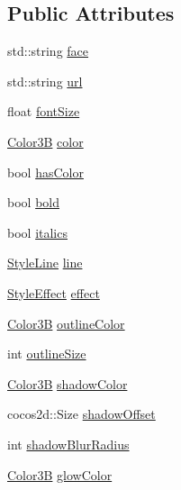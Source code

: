 \subsection*{Public Attributes}
\begin{DoxyCompactItemize}
\item 
std\+::string \hyperlink{structMyXMLVisitor_1_1Attributes_a8beb5513ad9e1cb927264f9ce4b37853}{face}
\item 
std\+::string \hyperlink{structMyXMLVisitor_1_1Attributes_ad50d857585d8559a33750a20c69c2843}{url}
\item 
float \hyperlink{structMyXMLVisitor_1_1Attributes_a9b879f7f8b98152e72396e881d9b310a}{font\+Size}
\item 
\hyperlink{structColor3B}{Color3B} \hyperlink{structMyXMLVisitor_1_1Attributes_a8fdc77de0eb7e0934c03437739392bb9}{color}
\item 
bool \hyperlink{structMyXMLVisitor_1_1Attributes_a3f0be96697ab0ffef086be9dfac55874}{has\+Color}
\item 
bool \hyperlink{structMyXMLVisitor_1_1Attributes_a2e76dd338cab73ef811b2954aad1dc62}{bold}
\item 
bool \hyperlink{structMyXMLVisitor_1_1Attributes_a3e6f2bee10a43fe6f2a022f118f66408}{italics}
\item 
\hyperlink{classMyXMLVisitor_a75a0b4e2723f798f35a0941ddba7c5a7}{Style\+Line} \hyperlink{structMyXMLVisitor_1_1Attributes_a14f09e95fdb1e89a922551830b5a6a30}{line}
\item 
\hyperlink{classMyXMLVisitor_a7f84d816c0b481e9cb35884996af6c2c}{Style\+Effect} \hyperlink{structMyXMLVisitor_1_1Attributes_a3c43060c939b2bc3301d2f987786eb9d}{effect}
\item 
\hyperlink{structColor3B}{Color3B} \hyperlink{structMyXMLVisitor_1_1Attributes_aca849a5371226911b3be1aadcfa3d1d6}{outline\+Color}
\item 
int \hyperlink{structMyXMLVisitor_1_1Attributes_a1ee02825e29b787efd1b8191434349b7}{outline\+Size}
\item 
\hyperlink{structColor3B}{Color3B} \hyperlink{structMyXMLVisitor_1_1Attributes_a80b30f7133ebe3abb8e8c511c958970f}{shadow\+Color}
\item 
cocos2d\+::\+Size \hyperlink{structMyXMLVisitor_1_1Attributes_abcf8c3b77a68781f4e27cd3bfcc153b8}{shadow\+Offset}
\item 
int \hyperlink{structMyXMLVisitor_1_1Attributes_a52b98a5e6193a98cb9dd12319bff1e79}{shadow\+Blur\+Radius}
\item 
\hyperlink{structColor3B}{Color3B} \hyperlink{structMyXMLVisitor_1_1Attributes_a8f37da4bfba5784b3fdd59642eafe7cb}{glow\+Color}
\end{DoxyCompactItemize}


